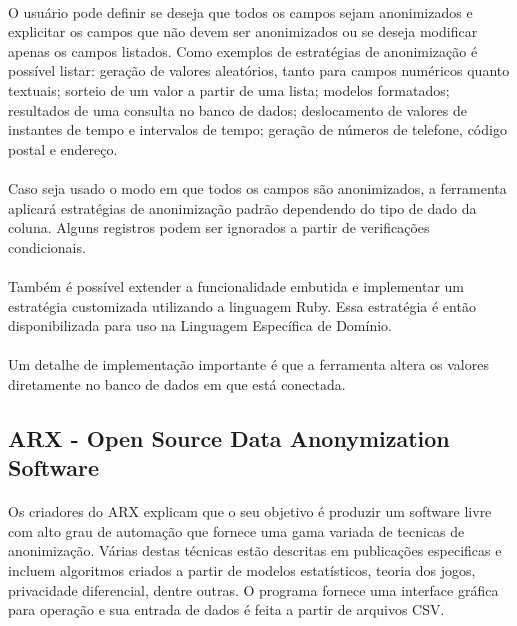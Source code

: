 \paragraph{} O usuário pode definir se deseja que todos os campos sejam anonimizados e explicitar os campos que não devem ser anonimizados ou se deseja modificar apenas os campos listados. Como exemplos de estratégias de anonimização é possível listar: geração de valores aleatórios, tanto para campos numéricos quanto textuais; sorteio de um valor a partir de uma lista; modelos formatados; resultados de uma consulta 
no banco de dados; deslocamento de valores de instantes de tempo e intervalos de tempo; geração de números de telefone, código postal e endereço. 

\paragraph{} Caso seja usado o modo em que todos os campos são anonimizados, a ferramenta aplicará estratégias de anonimização padrão dependendo do tipo de dado da coluna. Alguns registros podem ser ignorados a partir de verificações condicionais.

\paragraph{} Também é possível extender a funcionalidade embutida e implementar um estratégia customizada utilizando a linguagem Ruby. Essa estratégia é então disponibilizada para uso na Linguagem Específica de Domínio.

\paragraph{} Um detalhe de implementação importante é que a ferramenta altera os valores diretamente no banco de dados em que está conectada.


\subsection{ARX - Open Source Data Anonymization Software}

\paragraph{} Os criadores do ARX\cite{prasser2020flexible} explicam que o seu objetivo é produzir um software livre com alto grau de automação que fornece uma gama variada de tecnicas de anonimização. Várias destas técnicas estão descritas em publicações especificas e incluem algoritmos criados a partir de modelos estatísticos, teoria dos jogos, privacidade diferencial, dentre outras. O programa fornece uma interface gráfica para operação e sua entrada de dados é feita a partir de arquivos CSV.

